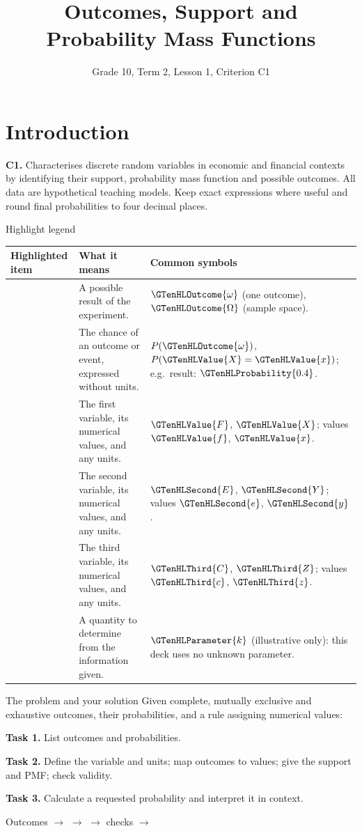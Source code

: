 \documentclass[12pt,aspectratio=169]{beamer}
\title{Outcomes, Support and Probability Mass Functions}
\subtitle{Grade 10, Term 2, Lesson 1, Criterion C1}
\author{}
\date{}
\makeatletter
\renewcommand{\arraystretch}{1.22}
\newcommand{\LessonHighlightLegend}{%
  \begingroup
  \small
  \setlength{\tabcolsep}{4pt}
  \renewcommand{\arraystretch}{1.0}
  \begin{tabularx}{\linewidth}{@{}>{\raggedright\arraybackslash}p{.255\linewidth}%
    >{\raggedright\arraybackslash}X>{\raggedright\arraybackslash}p{.34\linewidth}@{}}
    \toprule
    \textbf{Highlighted item} & \textbf{What it means} & \textbf{Common symbols} \\
    \midrule
    \GTenHLOutcome{Outcome} & A possible result of the experiment. &
      $\GTenHLOutcome{\omega}$ (one outcome),\newline
      $\GTenHLOutcome{\Omega}$ (sample space). \\
    \GTenHLProbability{Probability} & The chance of an outcome or event, expressed without units. &
      $P(\GTenHLOutcome{\omega})$, $P(\GTenHLValue{X}=\GTenHLValue{x})$;\newline
      e.g.\ result: $\GTenHLProbability{0.4}$. \\
    \GTenHLValue{First variable} & The first variable, its numerical values, and any units. &
      $\GTenHLValue{F}$, $\GTenHLValue{X}$; values $\GTenHLValue{f}$, $\GTenHLValue{x}$. \\
    \GTenHLSecond{Second variable} & The second variable, its numerical values, and any units. &
      $\GTenHLSecond{E}$, $\GTenHLSecond{Y}$; values $\GTenHLSecond{e}$, $\GTenHLSecond{y}$. \\
    \GTenHLThird{Third variable} & The third variable, its numerical values, and any units. &
      $\GTenHLThird{C}$, $\GTenHLThird{Z}$; values $\GTenHLThird{c}$, $\GTenHLThird{z}$. \\
    \GTenHLParameter{Unknown parameter} & A quantity to determine from the information given. &
      $\GTenHLParameter{k}$ (illustrative only): this deck uses no unknown parameter. \\
    \bottomrule
  \end{tabularx}\par
  \endgroup
}
\makeatother
\begin{document}
\section{Introduction}

\begin{frame}
  \vfill
  {\color{LessonTeal}\bfseries\insertsubtitle\par}
  \medskip
  {\huge\bfseries\inserttitle\par}
  \bigskip
  \textbf{C1.} Characterises discrete random variables in economic and
  financial contexts by identifying their support, probability mass function
  and possible outcomes.
  \vfill
  All data are hypothetical teaching models. Keep exact expressions where
  useful and round final probabilities to four decimal places.
  \vfill
\end{frame}

\begin{frame}[t]{Highlight legend}
  \LessonHighlightLegend
\end{frame}

\begin{frame}[t]{The problem and your solution}
  Given complete, mutually exclusive and exhaustive outcomes, their
  probabilities, and a rule assigning numerical values:

  \medskip
  \textbf{Task 1.} List outcomes and probabilities.\par
  \medskip
  \textbf{Task 2.} Define the variable and units; map outcomes to values;
  give the support and PMF; check validity.\par
  \medskip
  \textbf{Task 3.} Calculate a requested probability and interpret it in context.

  \bigskip
  \begin{center}
    Outcomes $\to$  $\to$
     $\to$ checks $\to$
  \end{center}
\end{frame}
\end{document}
